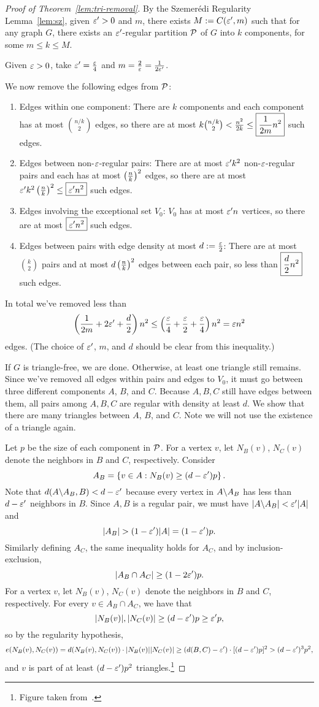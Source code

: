 \begin{proof}[Proof of Theorem~\ref{lem:tri-removal}]
By the Szemer\'edi Regularity Lemma~\ref{lem:sz}, given $\ep'>0$ and $m$, there exists $M:=C(\ep',m)$ such that for any graph $G$, there exists an $\ep'$-regular partition $\cal P$ of $G$ into $k$ components, for some $m\le k\le M$.

Given $\ep>0$, take $\ep'=\fc{\ep}{4}$ and $m=\fc2{\ep}=\fc{1}{2\ep'}$.

We now remove the following edges from $\cal P$:
\begin{enumerate}
\item Edges within one component: There are $k$ components and each component has at most $\binom{n/k}{2}$ edges, so there are at most $k\binom{n/k}2<\fc{n^2}{2k}\le \boxed{\fc{1}{2m}n^2}$ such edges.
\item Edges between non-$\ep$-regular pairs: There are at most $\ep'k^2$ non-$\ep$-regular pairs and each has at most $\pf{n}{k}^2$ edges, so there are at most $\ep'k^2\pf nk^2\le \boxed{\ep'n^2}$ such edges.
\item Edges involving the exceptional set $V_0$: $V_0$ has at most $\ep' n$ vertices, so there are at most $\boxed{\ep'n^2}$ such edges.
\item Edges between pairs with edge density at most $d:=\fc{\ep}{2}$: There are at most $\binom k2$ pairs and at most $d \pf{n}{k}^2$ edges between each pair, so less than $\boxed{\fc{d}{2}n^2}$ such edges.
\end{enumerate}
In total we've removed less than
\[
\pa{\rc{2m}+2\ep'+\fc{d}{2}}n^2\le \pa{\frac{\ep}{4}+\fc{\ep}{2}+\fc{\ep}{4}}n^2=\ep n^2
\]
edges. (The choice of $\ep'$, $m$, and $d$ should be clear from this inequality.)

If $G$ is triangle-free, we are done. Otherwise, at least one triangle still remains. Since we've removed all edges within pairs and edges to $V_0$, it must go between three different components $A$, $B$, and $C$. Because $A,B,C$ still have edges between them, all pairs among $A,B,C$ are regular with density at least $d$. We show that there are many triangles between $A$, $B$, and $C$. Note we will not use the existence of a triangle again.

Let $p$ be the size of each component in $\cal P$. For a vertex $v$, let $N_B(v)$, $N_C(v)$ denote the neighbors in $B$ and $C$, respectively.
Consider 
\[
A_B=\set{v\in A}{N_B(v)\ge (d-\ep')p}.
\]
Note that $d(A\bs A_B,B)<d-\ep'$ because every vertex in $A\bs A_B$ has less than $d-\ep'$ neighbors in $B$. Since $A,B$ is a regular pair, we must have $|A\bs A_B|< \ep'|A|$ and 
\[
|A_B|>(1-\ep')|A|=(1-\ep')p.
\]
Similarly defining $A_C$, the same inequality holds for $A_C$, and by inclusion-exclusion,
\[
|A_B\cap A_C|\ge (1-2\ep')p.
\]
For a vertex $v$, let $N_B(v)$, $N_C(v)$ denote the neighbors in $B$ and $C$, respectively. For every $v\in A_B\cap A_C$, we have that 
\[|N_B(v)|,|N_C(v)|\ge (d-\ep')p\ge \ep' p,\]
so by the regularity hypothesis,
\[
e(N_B(v),N_C(v))
=d(N_B(v),N_C(v))\cdot |N_B(v)||N_C(v)|
\ge (d(B,C)-\ep')\cdot [(d-\ep')p]^2> (d-\ep')^3p^2,
\]
and $v$ is part of at least $(d-\ep')p^2$ triangles.\footnote{Figure taken from~\cite{Li12}.}


\end{proof}
